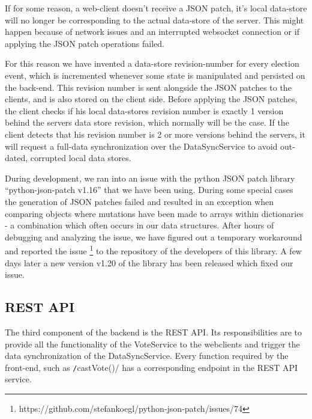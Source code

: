 If for some reason, a web-client doesn't receive a JSON patch, it's local data-store will no longer be corresponding to the actual data-store of the server. This might happen because of network issues and an interrupted websocket connection or if applying the JSON patch operations failed.

For this reason we have invented a data-store revision-number for every election event, which is incremented whenever some state is manipulated and persisted on the back-end. This revision number is sent alongside the JSON patches to the clients, and is also stored on the client side. Before applying the JSON patches, the client checks if his local data-stores revision number is exactly 1 version behind the servers data store revision, which normally will be the case. If the client detects that his revision number is 2 or more versions behind the servers, it will request a full-data synchronization over the DataSyncService to avoid out-dated, corrupted local data stores.

During development, we ran into an issue with the python JSON patch library "`python-json-patch v1.16"' that we have been using. During some special cases the generation of JSON patches failed and resulted in an exception when comparing objects where mutations have been made to arrays within dictionaries - a combination which often occurs in our data structures. After hours of debugging and analyzing the issue, we have figured out a temporary workaround and reported the issue \footnote{https://github.com/stefankoegl/python-json-patch/issues/74} to the repository of the developers of this library. A few days later a new version v1.20 of the library has been released which fixed our issue.

\subsection{REST API}
The third component of the backend is the REST API. Its responsibilities are to provide all the functionality of the VoteService to the webclients and trigger the data synchronization of the DataSyncService. Every function required by the front-end, such as \texttt/castVote()/ has a corresponding endpoint in the REST API service.


